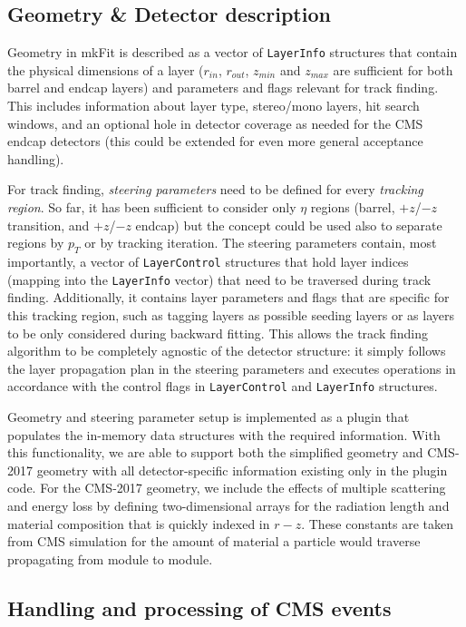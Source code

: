 \documentclass{webofc}
\def\mkfit{mkFit\xspace}
\def\stt#1{{\small\texttt{#1}}}
\begin{document}
\subsection{Geometry \& Detector description}

Geometry in \mkfit is described as a vector of \stt{LayerInfo} structures
that contain the physical dimensions of a layer ($r_{in}$, $r_{out}$, $z_{min}$
and $z_{max}$ are sufficient for both barrel and endcap layers) and parameters
and flags relevant for track finding. This includes information about layer
type, stereo/mono layers, hit search windows, and an optional hole in detector
coverage as needed for the CMS endcap detectors (this could be extended for
even more general acceptance handling).

For track finding, \emph{steering parameters} need to be defined for every
\emph{tracking region}. So far, it has been sufficient to consider only $\eta$
regions (barrel, $+z$/$-z$ transition, and $+z$/$-z$ endcap) but the concept
could be used also to separate regions by $p_T$ or by tracking iteration. The
steering parameters contain, most importantly, a vector of \stt{LayerControl}
structures that hold layer indices (mapping into the \stt{LayerInfo} vector)
that need to be traversed during track finding. Additionally, it contains
layer parameters and flags that are specific for this tracking region, such as
tagging layers as possible seeding layers or as layers to be only considered
during backward fitting. This allows the track finding algorithm to be completely
agnostic of the detector structure: it simply follows the layer propagation
plan in the steering parameters and executes operations in accordance with the
control flags in \stt{LayerControl} and \stt{LayerInfo} structures.

Geometry and steering parameter setup is implemented as a plugin that
populates the in-memory data structures with the required information. With this
functionality, we are able to support both the simplified geometry and
CMS-2017 geometry with all detector-specific information existing only in the
plugin code. For the CMS-2017 geometry, we include the effects of multiple 
scattering and energy loss by defining two-dimensional arrays for the radiation 
length and material composition that is quickly indexed in $r-z$. These constants
are taken from CMS simulation for the amount of material a particle would traverse 
propagating from module to module. 

\subsection{Handling and processing of CMS events}
\label{ssec:cms-event-processing}
\end{document}
